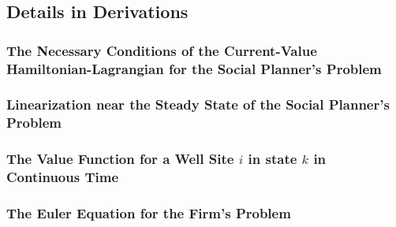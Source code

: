 \subsection{Details in Derivations}
\label{C3-Appendix_Derivations}

\subsubsection{The Necessary Conditions of the Current-Value Hamiltonian-Lagrangian for the Social Planner's Problem}
\label{C3-Appendix_Derivations_Social-Planners-Problem_Necessary-Conditions}

\subsubsection{Linearization near the Steady State of the Social Planner's Problem}
\label{C3-Appendix_Derivations_Linearization-near-the-Steady-State-of-the-Social-Planners-Problem}


\subsubsection{The Value Function for a Well Site $i$ in state $k$ in Continuous Time}
\label{C3-Appendix_Derivations_Value-Function-in-Continuous-Time}


\subsubsection{The Euler Equation for the Firm's Problem}
\label{C3-Appendix_Derivations_Euler-Equation-for-the-Firms-Problem}




\clearpage
